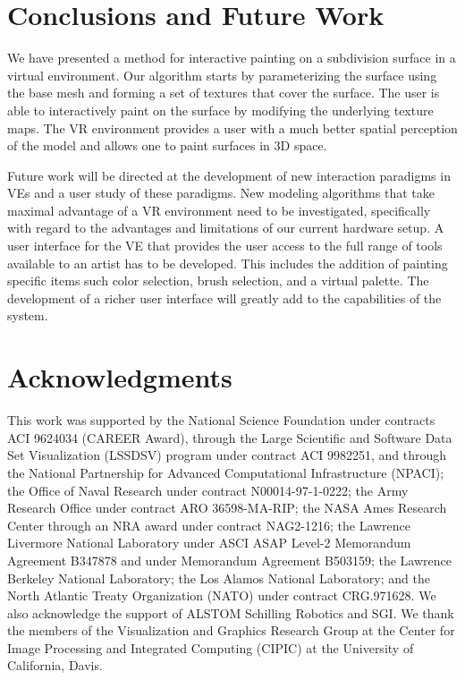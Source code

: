 \documentclass[10pt,twocolumn]{article}
\begin{document}
\section{Conclusions and Future Work}
We have presented a method for interactive painting on a subdivision surface
in a virtual environment. 
Our algorithm starts by parameterizing the surface using the base mesh
and forming a set of textures that cover the surface.
The user is able to interactively paint on the surface by modifying the underlying texture maps.
The VR environment provides a user with a much better spatial perception of the model
and allows one to paint surfaces in 3D space. 

Future work will be directed at the development of new interaction paradigms
in VEs and a user study of these paradigms.
New modeling algorithms that take maximal advantage of a
VR environment need to be investigated, specifically with regard
to the advantages and limitations of our current hardware setup.
A user interface for the VE that provides the user 
access to the full range of tools available to an artist has to be developed. 
This includes the addition of painting specific items such color selection, 
brush selection, and a virtual palette.  
The development of a richer user interface will greatly add to the
capabilities of the system.

\section*{Acknowledgments} 

This work was supported by the National Science Foundation under 
contracts ACI 9624034 (CAREER Award), through the Large Scientific and 
Software Data Set Visualization (LSSDSV) program under contract ACI 
9982251, and through the National Partnership for Advanced 
Computational Infrastructure (NPACI); the Office of Naval Research 
under contract N00014-97-1-0222; the Army Research Office under 
contract ARO 36598-MA-RIP; the NASA Ames Research Center through an 
NRA award under contract NAG2-1216; the Lawrence Livermore National 
Laboratory under ASCI ASAP Level-2 Memorandum Agreement B347878 and 
under Memorandum Agreement B503159; the Lawrence Berkeley National 
Laboratory; the Los Alamos National Laboratory; and the North Atlantic 
Treaty Organization (NATO) under contract CRG.971628.  We also 
acknowledge the support of ALSTOM Schilling Robotics and SGI. We thank 
the members of the Visualization and Graphics Research Group at the 
Center for Image Processing and Integrated Computing (CIPIC) at the 
University of California, Davis. 
  
  

  
\end{document}
